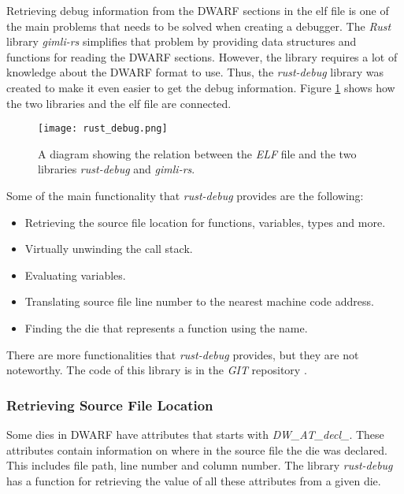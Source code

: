 
Retrieving debug information from the \gls{DWARF} sections in the \gls{elf} file is one of the main problems that needs to be solved when creating a debugger.
The \emph{Rust} library \emph{gimli-rs} simplifies that problem by providing data structures and functions for reading the \gls{DWARF} sections.
However, the library requires a lot of knowledge about the \gls{DWARF} format to use.
Thus, the \emph{rust-debug} library was created to make it even easier to get the debug information.
Figure \ref{fig:rustdebug} shows how the two libraries and the \gls{elf} file are connected.


\begin{figure}[h]
	\centering
	\texttt{[image: rust\_debug.png]}
	\caption{A diagram showing the relation between the \emph{ELF} file and the two libraries \emph{rust-debug} and \emph{gimli-rs}.}
	\label{fig:rustdebug}
\end{figure}


Some of the main functionality that \emph{rust-debug} provides are the following:

\begin{itemize}
  \item Retrieving the source file location for functions, variables, types and more.
  \item Virtually unwinding the call stack.
  \item Evaluating variables.
  \item Translating source file line number to the nearest machine code address.
  \item Finding the \gls{die} that represents a function using the name.
\end{itemize}

There are more functionalities that \emph{rust-debug} provides, but they are not noteworthy.
The code of this library is in the \emph{GIT} repository \cite{rust-debug}.



\subsubsection{Retrieving Source File Location}
Some \glspl{die} in \gls{DWARF} have attributes that starts with \emph{DW\_AT\_decl\_}.
These attributes contain information on where in the source file the \gls{die} was declared.
This includes file path, line number and column number.
The library \emph{rust-debug} has a function for retrieving the value of all these attributes from a given \gls{die}.


